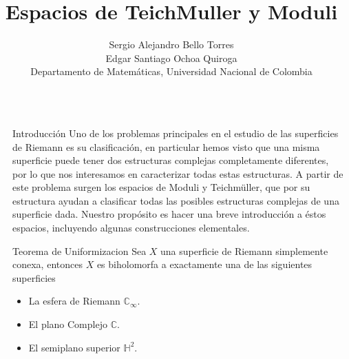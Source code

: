 \documentclass[final]{beamer}
\title{\Huge Espacios de TeichMuller y Moduli}
\author{\Large Sergio Alejandro Bello Torres\\Edgar Santiago Ochoa Quiroga\\Departamento de Matemáticas, Universidad Nacional de Colombia}
\newcommand\C{\ensuremath{\mathbb{C}}}
\newcommand\Hs{\ensuremath{\mathbb{H}}}
\newlength{\sepwidth}
\newlength{\colwidth}
\newcommand{\separatorcolumn}{\begin{column}{\sepwidth}\end{column}}
\begin{document}
\Large
\begin{frame}[t,fragile]
\begin{columns}[t]
\separatorcolumn

\begin{column}{\colwidth}

\begin{block}{Introducción}
Uno de los problemas principales en el estudio de las superficies de Riemann es su clasificación, en particular hemos visto que una misma superficie puede tener dos estructuras complejas completamente diferentes, por lo que nos interesamos en caracterizar todas estas estructuras. A partir de este problema surgen los espacios de Moduli y Teichmüller, que por su estructura ayudan a clasificar todas las posibles estructuras complejas de una superficie dada. Nuestro propósito es hacer una breve introducción a éstos espacios, incluyendo algunas construcciones elementales.
\end{block}

\begin{exampleblock}{Teorema de Uniformizacion}
Sea $X$ una superficie de Riemann simplemente conexa, entonces $X$ es biholomorfa a exactamente una de las siguientes superficies
        \begin{itemize}
            \item La esfera de Riemann $\C_{\infty}.$
            \item El plano Complejo $\C.$
            \item El semiplano superior $\Hs^2.$
        \end{itemize}
\end{exampleblock}
    

\end{column}
\end{columns}
\end{frame}
\end{document}
